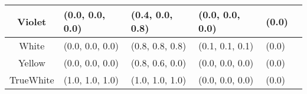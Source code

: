 \begin{table}[H]
\begin{footnotesize}
\begin{center}
\begin{tabular}{|c||l|l|l|l|l|}
Violet & (0.0, 0.0, 0.0) & (0.4, 0.0, 0.8) & (0.0, 0.0, 0.0) & (0.0) \\ \hline
White & (0.0, 0.0, 0.0) & (0.8, 0.8, 0.8) & (0.1, 0.1, 0.1) & (0.0) \\ \hline
Yellow & (0.0, 0.0, 0.0) & (0.8, 0.6, 0.0) & (0.0, 0.0, 0.0) & (0.0) \\ \hline
TrueWhite & (1.0, 1.0, 1.0) & (1.0, 1.0, 1.0) & (0.0, 0.0, 0.0) & (0.0) \\ \hline
\end{tabular}
\end{center}
\end{footnotesize}
\end{table}
